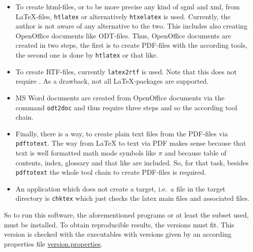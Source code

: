 \begin{itemize}
****
\item
To create \gls{html}-files, 
or to be more precise any kind of \gls{sgml} and \gls{xml}, 
from \LaTeX-files, \texttt{htlatex} or alternatively \texttt{htxelatex} is used. 
Currently, the author is not aware of any alternative to the two. 
This includes also creating OpenOffice documents like ODT-files. 
Thus, OpenOffice documents are created in two steps, 
the first is to create PDF-files with the according tools, 
the second one is done by \texttt{htlatex} or that like. 
\item
To create RTF-files, currently \texttt{latex2rtf} is used. 
Note that this does not require \pdflatex. 
As a drawback, not all \LaTeX-packages are supported. 
\item
MS Word documents are created from OpenOffice documents 
via the command \texttt{odt2doc}  and thus require three steps 
and so the according tool chain. 
\item
Finally, there is a way, to create plain text files from the PDF-files 
via \texttt{pdftotext}. 
The way from \LaTeX{} to text via PDF makes sense 
because that text is well formatted math mode symbols like $\pi$ 
and because table of contents, index, glossary and that like are included. 
So, for that task, besides \texttt{pdftotext} the whole tool chain to create
PDF-files is required. 
\item
An application which does not create a target, 
i.e.~a file in the target directory is \texttt{chktex} 
which just checks the latex main files and associated files. 
\end{itemize}

So to run this software, the aforementioned programs 
or at least the subset used, must be installed.
To obtain reproducible results, the versions must fit.
This version is checked with the executables with versions given by 
an according properties file 
\href{\urlSite fromMain/version.properties}{version.properties}. 



